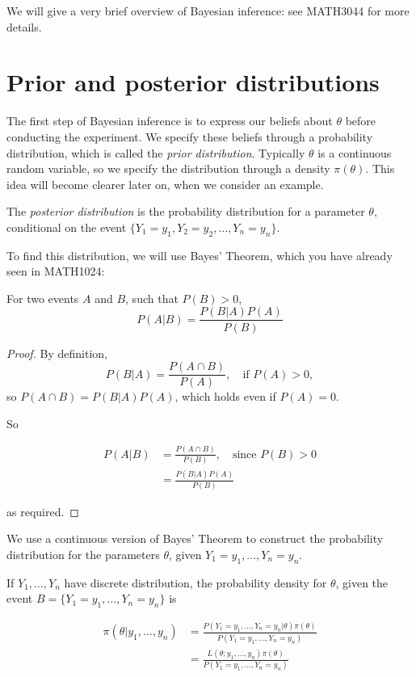 \documentclass[]{book}
\theoremstyle{definition}
\theoremstyle{definition}
\theoremstyle{definition}
\theoremstyle{remark}
\let\BeginKnitrBlock\begin \let\EndKnitrBlock\end
\begin{document}
We will give a very brief overview of Bayesian inference: see MATH3044
for more details.

\section{Prior and posterior
distributions}\label{prior-and-posterior-distributions}

The first step of Bayesian inference is to express our beliefs about
\(\theta\) before conducting the experiment. We specify these beliefs
through a probability distribution, which is called the \emph{prior
distribution}. Typically \(\theta\) is a continuous random variable, so
we specify the distribution through a density \(\pi(\theta)\). This idea
will become clearer later on, when we consider an example.

The \emph{posterior distribution} is the probability distribution for a
parameter \(\theta\), conditional on the event
\(\{Y_1 = y_1, Y_2 = y_2, \ldots, Y_n = y_n\}.\)

To find this distribution, we will use Bayes' Theorem, which you have
already seen in MATH1024:

\BeginKnitrBlock{theorem}[Bayes' Theorem]
\protect\hypertarget{thm:unnamed-chunk-110}{}{\label{thm:unnamed-chunk-110}
\iffalse (Bayes' Theorem) \fi{} }For two events \(A\) and \(B\), such
that \(P(B) > 0\), \[P(A | B) = \frac{P(B | A) P(A)}{P(B)}\]
\EndKnitrBlock{theorem}

\BeginKnitrBlock{proof}
\iffalse{} {Proof. } \fi{}By definition,
\[P(B|A) = \frac{P(A \cap B)}{P(A)}, \quad \text{if $P(A) > 0$},\] so
\(P(A \cap B) = P(B | A) P(A)\), which holds even if \(P(A) = 0\).

So

\begin{align*}
P(A|B) &= \frac{P(A \cap B)}{P(B)}, \quad \text{since $P(B) > 0$} \\
&= \frac{P(B | A) P(A)}{P(B)}
\end{align*}

as required.
\EndKnitrBlock{proof}

We use a continuous version of Bayes' Theorem to construct the
probability distribution for the parameters \(\theta\), given
\(Y_1 = y_1, \ldots, Y_n = y_n\).

If \(Y_1, \ldots, Y_n\) have discrete distribution, the probability
density for \(\theta\), given the event
\(B = \{Y_1 = y_1, \ldots, Y_n = y_n\}\) is

\begin{align*}
\pi(\theta| y_1, \ldots, y_n) &= \frac{P(Y_1 = y_1, \ldots, Y_n = y_n| \theta) \pi(\theta)}{P(Y_1 = y_1, \ldots, Y_n = y_n)} \\
&= \frac{L(\theta; y_1, \ldots, y_n) \pi(\theta)}{P(Y_1 = y_1, \ldots, Y_n = y_n)}
\end{align*}
\end{document}
